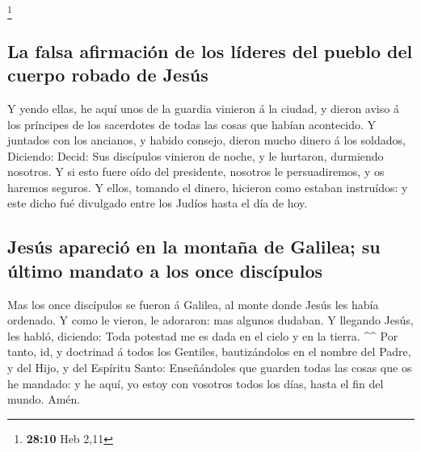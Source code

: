 \footnote{\textbf{28:10} Heb 2,11}

\hypertarget{la-falsa-afirmaciuxf3n-de-los-luxedderes-del-pueblo-del-cuerpo-robado-de-jesuxfas}{%
\subsection{La falsa afirmación de los líderes del pueblo del cuerpo
robado de
Jesús}\label{la-falsa-afirmaciuxf3n-de-los-luxedderes-del-pueblo-del-cuerpo-robado-de-jesuxfas}}

 Y yendo ellas, he aquí unos de la guardia vinieron á la
ciudad, y dieron aviso á los príncipes de los sacerdotes de todas las
cosas que habían acontecido.  Y juntados con los
ancianos, y habido consejo, dieron mucho dinero á los soldados,
 Diciendo: Decid: Sus discípulos vinieron de noche, y le
hurtaron, durmiendo nosotros.  Y si esto fuere oído del
presidente, nosotros le persuadiremos, y os haremos seguros.
 Y ellos, tomando el dinero, hicieron como estaban
instruídos: y este dicho fué divulgado entre los Judíos hasta el día de
hoy.

\hypertarget{jesuxfas-apareciuxf3-en-la-montauxf1a-de-galilea-su-uxfaltimo-mandato-a-los-once-discuxedpulos}{%
\subsection{Jesús apareció en la montaña de Galilea; su último mandato a
los once
discípulos}\label{jesuxfas-apareciuxf3-en-la-montauxf1a-de-galilea-su-uxfaltimo-mandato-a-los-once-discuxedpulos}}

 Mas los once discípulos se fueron á Galilea, al monte
donde Jesús les había ordenado.  Y como le vieron, le
adoraron: mas algunos dudaban.  Y llegando Jesús, les
habló, diciendo: Toda potestad me es dada en el cielo y en la tierra.
\^{}\^{}  Por tanto, id, y doctrinad á todos los
Gentiles, bautizándolos en el nombre del Padre, y del Hijo, y del
Espíritu Santo:  Enseñándoles que guarden todas las cosas
que os he mandado: y he aquí, yo estoy con vosotros todos los días,
hasta el fin del mundo. Amén.
